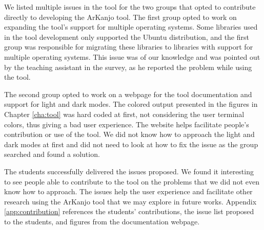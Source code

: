 We listed multiple issues in the tool for the two groups that opted to contribute directly 
to developing the ArKanjo tool. The first group opted to work on expanding the tool's support 
for multiple operating systems. Some libraries used in the tool development only supported the 
Ubuntu distribution, and the first group was responsible for migrating these libraries to 
libraries with support for multiple operating systems. This issue was of our knowledge and 
was pointed out by the teaching assistant in the survey, as he reported the problem while 
using the tool.

The second group opted to work on a webpage for the tool documentation and support for 
light and dark modes. The colored output presented in the figures in Chapter \ref{cha:tool} was 
hard coded at first, not considering the user terminal colors, thus giving a bad user experience. 
The website helps facilitate people's contribution or use of the tool. We did not know how to 
approach the light and dark modes at first and did not need to look at how to fix the issue as 
the group searched and found a solution.

The students successfully delivered the issues proposed. We found it interesting to see 
people able to contribute to the tool on the problems that we did not even know how to approach.
The issues help the user experience and facilitate other research using the ArKanjo tool that 
we may explore in future works. Appendix \ref{app:contribution} references the 
students' contributions, the issue list proposed to the students, and figures from 
the documentation webpage.
